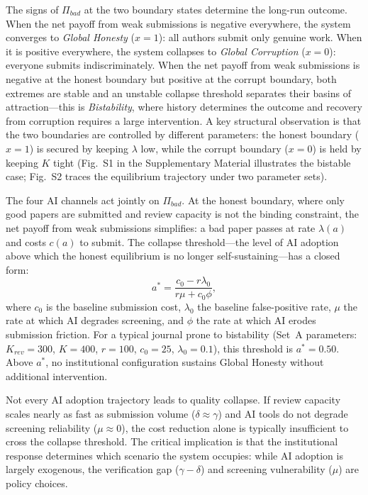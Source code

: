 \documentclass{article}
\begin{document}
The signs of $\Pi_{bad}$ at the two boundary states determine the long-run outcome.
When the net payoff from weak submissions is negative everywhere, the system converges to \emph{Global Honesty} ($x = 1$): all authors submit only genuine work.
When it is positive everywhere, the system collapses to \emph{Global Corruption} ($x = 0$): everyone submits indiscriminately.
When the net payoff from weak submissions is negative at the honest boundary but positive at the corrupt boundary, both extremes are stable and an unstable collapse threshold separates their basins of attraction---this is \emph{Bistability}, where history determines the outcome and recovery from corruption requires a large intervention.
A key structural observation is that the two boundaries are controlled by different parameters: the honest boundary ($x=1$) is secured by keeping $\lambda$ low, while the corrupt boundary ($x=0$) is held by keeping $K$ tight (Fig.~S1 in the Supplementary Material illustrates the bistable case; Fig.~S2 traces the equilibrium trajectory under two parameter sets).

The four AI channels act jointly on $\Pi_{bad}$.
At the honest boundary, where only good papers are submitted and review capacity is not the binding constraint, the net payoff from weak submissions simplifies: a bad paper passes at rate $\lambda(a)$ and costs $c(a)$ to submit.
The collapse threshold---the level of AI adoption above which the honest equilibrium is no longer self-sustaining---has a closed form:
\begin{equation}
    a^{*} = \frac{c_0 - r\lambda_0}{r\mu + c_0\phi},
    \label{eq:astar}
\end{equation}
where $c_0$ is the baseline submission cost, $\lambda_0$ the baseline false-positive rate, $\mu$ the rate at which AI degrades screening, and $\phi$ the rate at which AI erodes submission friction.
For a typical journal prone to bistability (Set~A parameters: $K_{rev}=300$, $K=400$, $r=100$, $c_0=25$, $\lambda_0=0.1$), this threshold is $a^* = 0.50$.
Above $a^*$, no institutional configuration sustains Global Honesty without additional intervention.

Not every AI adoption trajectory leads to quality collapse.
If review capacity scales nearly as fast as submission volume ($\delta \approx \gamma$) and AI tools do not degrade screening reliability ($\mu \approx 0$), the cost reduction alone is typically insufficient to cross the collapse threshold.
The critical implication is that the institutional response determines which scenario the system occupies: while AI adoption is largely exogenous, the verification gap ($\gamma - \delta$) and screening vulnerability ($\mu$) are policy choices.
\end{document}
